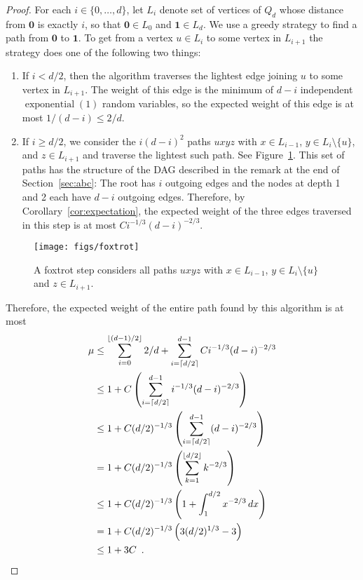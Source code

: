 \documentclass[a4paper,UKenglish]{lipics-v2016}
\DeclareMathOperator{\exponential}{exponential}
\newcommand{\zero}{\mathbf{0}}
\newcommand{\one}{\mathbf{1}}
\begin{document}
\begin{proof}
  For each $i\in\{0,\ldots,d\}$, let $L_i$ denote set of vertices of $Q_d$
  whose distance from $\zero$ is exactly $i$, so that $\zero\in L_0$ and
  $\one\in L_d$.  We use a greedy strategy to find a path from $\zero$
  to $\one$.  To get from a vertex $u\in L_i$ to some vertex in $L_{i+1}$
  the strategy does one of the following two things:
  \begin{enumerate}
     \item If $i < d/2$, then the algorithm traverses the lightest edge
     joining $u$ to some vertex in $L_{i+1}$.  The weight of this edge is
     the minimum of $d-i$ independent $\exponential(1)$ random variables,
     so the expected weight of this edge is at most $1/(d-i)\le 2/d$.

     \item If $i \ge d/2$, we consider the $i(d-i)^2$ paths $uxyz$ with
     $x\in L_{i-1}$, $y\in L_i\setminus\{u\}$, and $z\in L_{i+1}$ and
     traverse the lightest such path.  See Figure~\ref{fig:foxtrot}. This
     set of paths has the structure of the DAG described in the
     remark at the end of Section~\ref{sec:abc}:  The root has $i$
     outgoing edges and the nodes at depth 1 and 2 each have $d-i$
     outgoing edges.  Therefore, by Corollary~\ref{cor:expectation},
     the expected weight of the three edges traversed in this step is
     at most $Ci^{-1/3}(d-i)^{-2/3}$.
  \end{enumerate}
  \begin{figure}
    \begin{center}
       \texttt{[image: figs/foxtrot]}
    \end{center}
    \caption{A foxtrot step considers all paths $uxyz$ with $x\in L_{i-1}$, $y\in L_i\setminus\{u\}$ and $z\in L_{i+1}$.}
    \label{fig:foxtrot}
  \end{figure}
  Therefore, the expected weight of the entire path found by this
  algorithm is at most
  \begin{align*}
    \mu & \le \sum_{i=0}^{\lfloor (d-1)/2\rfloor} 2/d 
               + \sum_{i=\lceil d/2\rceil}^{d-1} Ci^{-1/3}(d-i)^{-2/3} \\
        & \le 1 
               + C\left(\sum_{i=\lceil d/2\rceil}^{d-1} i^{-1/3}(d-i)^{-2/3}\right) \\
        & \le 1 
               + C(d/2)^{-1/3}\left(\sum_{i=\lceil d/2\rceil}^{d-1} (d-i)^{-2/3}\right) \\
        & = 1 
               + C(d/2)^{-1/3}\left(\sum_{k=1}^{\lfloor d/2\rfloor}k^{-2/3}\right) \\
        & \le 1
               + C(d/2)^{-1/3}\left(1+\int_1^{d/2}x^{-2/3}\,dx\right) \\
        & = 1
               + C(d/2)^{-1/3}\left(3(d/2)^{1/3}-3\right) \\
        & \le 1
               + 3C \enspace . \qedhere
  \end{align*}
\end{proof}
\end{document}
